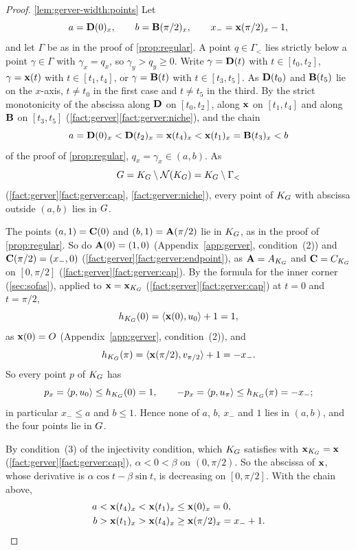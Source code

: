 \begin{proof}
\ref{lem:gerver-width:points} Let
\[
  a=\mathbf{D}(0)_x,\qquad b=\mathbf{B}(\pi/2)_x,\qquad x_-=\mathbf{x}(\pi/2)_x-1,
\]
and let $\Gamma$ be as in the proof of \cref{prop:regular}. A point
$q\in\Gamma_<$ lies strictly below a point $\gamma\in\Gamma$ with
$\gamma_x=q_x$, so $\gamma_y>q_y\ge0$. Write $\gamma=\mathbf{D}(t)$ with
$t\in[t_0,t_2]$, $\gamma=\mathbf{x}(t)$ with $t\in[t_1,t_4]$, or $\gamma=\mathbf{B}(t)$ with
$t\in[t_3,t_5]$. As $\mathbf{D}(t_0)$ and $\mathbf{B}(t_5)$ lie on the $x$-axis, $t\ne t_0$ in
the first case and $t\ne t_5$ in the third. By the strict monotonicity of the
abscissa along $\mathbf{D}$ on $[t_0,t_2]$, along $\mathbf{x}$ on $[t_1,t_4]$ and along $\mathbf{B}$
on $[t_3,t_5]$ (\cref{fact:gerver}\ref{fact:gerver:niche}), and the chain
\[
  a=\mathbf{D}(0)_x<\mathbf{D}(t_2)_x=\mathbf{x}(t_4)_x<\mathbf{x}(t_1)_x=\mathbf{B}(t_3)_x<b
\]
of the proof of \cref{prop:regular}, $q_x=\gamma_x\in(a,b)$. As
\[
  G=K_G\setminus\mathcal{N}(K_G)=K_G\setminus\Gamma_<
\]
(\cref{fact:gerver}\ref{fact:gerver:cap}, \ref{fact:gerver:niche}), every point
of $K_G$ with abscissa outside $(a,b)$ lies in $G$.

The points $(a,1)=\mathbf{C}(0)$ and $(b,1)=\mathbf{A}(\pi/2)$ lie in $K_G$, as in the proof
of \cref{prop:regular}. So do $\mathbf{A}(0)=(1,0)$ (Appendix~\ref{app:gerver},
condition~(2)) and $\mathbf{C}(\pi/2)=(x_-,0)$
(\cref{fact:gerver}\ref{fact:gerver:endpoint}), as $\mathbf{A}=A_{K_G}$ and
$\mathbf{C}=C_{K_G}$ on $[0,\pi/2]$ (\cref{fact:gerver}\ref{fact:gerver:cap}). By the
formula for the inner corner (\cref{sec:sofas}), applied to $\mathbf{x}=\mathbf{x}_{K_G}$
(\cref{fact:gerver}\ref{fact:gerver:cap}) at $t=0$ and $t=\pi/2$,
\[
  h_{K_G}(0)=\langle \mathbf{x}(0),u_0\rangle+1=1,
\]
as $\mathbf{x}(0)=O$ (Appendix~\ref{app:gerver}, condition~(2)), and
\[
  h_{K_G}(\pi)=\langle \mathbf{x}(\pi/2),v_{\pi/2}\rangle+1=-x_-.
\]
So every point $p$ of $K_G$ has
\[
  p_x=\langle p,u_0\rangle\le h_{K_G}(0)=1,\qquad-p_x=\langle p,u_\pi\rangle\le h_{K_G}(\pi)=-x_-;
\]
in particular $x_-\le a$ and $b\le1$. Hence none of $a$, $b$, $x_-$ and $1$ lies
in $(a,b)$, and the four points lie in $G$.

By condition~(3) of the injectivity condition, which $K_G$ satisfies with
$\mathbf{x}_{K_G}=\mathbf{x}$ (\cref{fact:gerver}\ref{fact:gerver:cap}), $\alpha<0<\beta$ on
$(0,\pi/2)$. So the abscissa of $\mathbf{x}$, whose derivative is $\alpha\cos
t-\beta\sin t$, is decreasing on $[0,\pi/2]$. With the chain above,
\begin{align*}
  a&<\mathbf{x}(t_4)_x<\mathbf{x}(t_1)_x\le\mathbf{x}(0)_x=0,\\
  b&>\mathbf{x}(t_1)_x>\mathbf{x}(t_4)_x\ge\mathbf{x}(\pi/2)_x=x_-+1.
\end{align*}


\end{proof}
